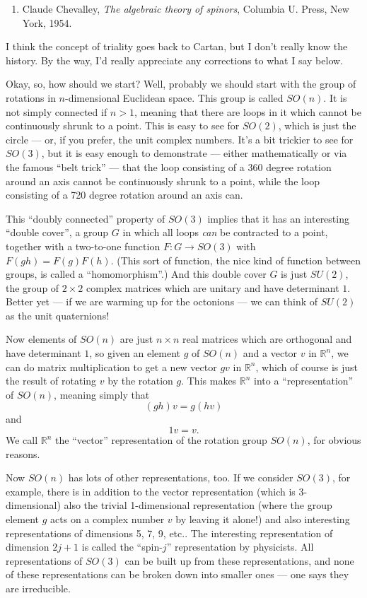 \documentclass{article}
\def\tightlist{}
\begin{document}
\begin{enumerate}
\def\labelenumi{\arabic{enumi})}
\setcounter{enumi}{1}
\tightlist
\item
  Claude Chevalley, \emph{The algebraic theory of spinors}, Columbia U.
  Press, New York, 1954.
\end{enumerate}

I think the concept of triality goes back to Cartan, but I don't really
know the history. By the way, I'd really appreciate any corrections to
what I say below.

Okay, so, how should we start? Well, probably we should start with the
group of rotations in \(n\)-dimensional Euclidean space. This group is
called \(SO(n)\). It is not simply connected if \(n > 1\), meaning that
there are loops in it which cannot be continuously shrunk to a point.
This is easy to see for \(SO(2)\), which is just the circle --- or, if
you prefer, the unit complex numbers. It's a bit trickier to see for
\(SO(3)\), but it is easy enough to demonstrate --- either
mathematically or via the famous ``belt trick'' --- that the loop
consisting of a 360 degree rotation around an axis cannot be
continuously shrunk to a point, while the loop consisting of a 720
degree rotation around an axis can.

This ``doubly connected'' property of \(SO(3)\) implies that it has an
interesting ``double cover'', a group \(G\) in which all loops
\emph{can} be contracted to a point, together with a two-to-one function
\(F\colon G \to SO(3)\) with \(F(gh) = F(g)F(h)\). (This sort of
function, the nice kind of function between groups, is called a
``homomorphism''.) And this double cover \(G\) is just \(SU(2)\), the
group of \(2\times2\) complex matrices which are unitary and have
determinant \(1\). Better yet --- if we are warming up for the octonions
--- we can think of \(SU(2)\) as the unit quaternions!

Now elements of \(SO(n)\) are just \(n\times n\) real matrices which are
orthogonal and have determinant \(1\), so given an element \(g\) of
\(SO(n)\) and a vector \(v\) in \(\mathbb{R}^n\), we can do matrix
multiplication to get a new vector \(gv\) in \(\mathbb{R}^n\), which of
course is just the result of rotating \(v\) by the rotation \(g\). This
makes \(\mathbb{R}^n\) into a ``representation'' of \(SO(n)\), meaning
simply that \[(gh)v = g(hv)\] and \[1v = v.\] We call \(\mathbb{R}^n\)
the ``vector'' representation of the rotation group \(SO(n)\), for
obvious reasons.

Now \(SO(n)\) has lots of other representations, too. If we consider
\(SO(3)\), for example, there is in addition to the vector
representation (which is 3-dimensional) also the trivial 1-dimensional
representation (where the group element \(g\) acts on a complex number
\(v\) by leaving it alone!) and also interesting representations of
dimensions 5, 7, 9, etc.. The interesting representation of dimension
\(2j+1\) is called the ``spin-\(j\)'' representation by physicists. All
representations of \(SO(3)\) can be built up from these representations,
and none of these representations can be broken down into smaller ones
--- one says they are irreducible.
\end{document}
